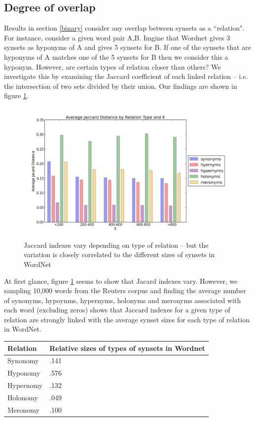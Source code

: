 \documentclass{article}
\begin{document}
\subsection{Degree of overlap}
Results in section \ref{binary} consider any overlap between synsets as a  ``relation". For instance, consider a given word pair A,B. Imgine that Wordnet gives 3 synsets as hyponyms of A and gives 5 synsets for B. If one of the synsets that are hyponyms of A matches one of the 5 synsets for B then we consider this a hyponym. However, are certain types of relation closer than others? We investigate this by examining the Jaccard coefficient of each linked relation -- i.e. the intersection of two sets divided by their union. Our findings are shown in figure \ref{fig:jacard}.

\begin{figure}[!ht]
\centerline{\includegraphics[scale=.5]{jacard.png}}
  \caption{Jaccard indexes vary depending on type of relation -- but the variation is closely correlated to the different sizes of synsets in WordNet}
  \label{fig:jacard}
\end{figure}

At first glance, figure \ref{fig:jacard} seems to show that Jacard indexes vary. However, we sampling 10,000 words from the Reuters corpus and finding the average number of synonyms, hypoynms, hypernyms, holonyms and meronyms associated with each word (excluding zeros) shows that Jaccard indexes for a given type of relation are strongly linked with the average synset sizes for each type of relation in WordNet.

\begin{center}
\centering
    \begin{tabular}{ | l | l |}
    \hline
Relation & Relative sizes of types of synsets in Wordnet \\  \hline
Synonomy & .141 \\  \hline
Hyponomy & .576  \\  \hline
Hypernomy & .132 \\  \hline
Holonomy & .049 \\  \hline
Meronomy & .100 \\  \hline
    \end{tabular}
\end{center}
\end{document}
